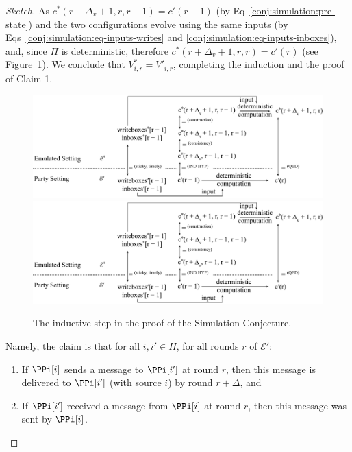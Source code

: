 \begin{proof}[Sketch]
  As $c^*(r + \Delta_v + 1, r, r - 1) = c'(r - 1)$ (by Eq~\ref{conj:simulation:pre-state})
  and the two configurations evolve using the same inputs (by
  Eqs~\ref{conj:simulation:eq-inputs-writes} and \ref{conj:simulation:eq-inputs-inboxes}),
  and, since $\Pi$ is deterministic,
  therefore $c^*(r + \Delta_v + 1, r, r) = c'(r)$ (see Figure~\ref{fig.emulation-claim-1-induction}).
  We conclude that $V^*_{i,r} = V'_{i,r}$, completing the induction
  and the proof of Claim 1.

  \begin{figure}
    \centering
    \iftwocolumn
    \includegraphics[width=0.6 \textwidth,keepaspectratio]{figures/emulation-claim-1-induction.pdf}
    \else
    \includegraphics[width=\textwidth,keepaspectratio]{figures/emulation-claim-1-induction.pdf}
    \fi
    \caption{The inductive step in the proof of the Simulation Conjecture.}
    \label{fig.emulation-claim-1-induction}
  \end{figure}

  Namely, the claim is that for all $i, i' \in H$, for all rounds $r$ of $\mathcal{E}'$:

  \begin{enumerate}[label=(\alph*)]
    \item
    \label{conj:simulation:claim-delta}
    If $\PPi[i]$ sends a message to $\PPi[i']$ at round $r$, then this message is delivered to $\PPi[i']$ (with source $i$) by round $r + \Delta$, and

    \item
    If $\PPi[i']$ received a message from $\PPi[i]$ at round $r$, then this message was sent by $\PPi[i]$.
  \end{enumerate}


\end{proof}
